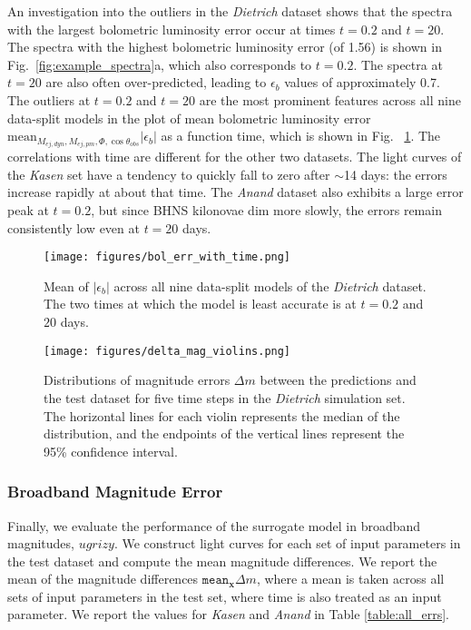 \documentclass[fleqn,usenatbib,useAMS]{mnras}
\begin{document}
An investigation into the outliers in the \emph{Dietrich} dataset shows that the spectra with the largest bolometric luminosity error occur at times $t=0.2$ and $t=20$.
The spectra with the highest bolometric luminosity error (of 1.56) is shown in Fig.~\ref{fig:example_spectra}a, which also corresponds to $t=0.2$.
The spectra at $t=20$ are also often over-predicted, leading to $\epsilon_b$ values of approximately 0.7.
The outliers at $t=0.2$ and $t=20$ are the most prominent features across all nine data-split models in the plot of mean bolometric luminosity error $\text{mean}_{M_{ej, dyn}, M_{ej, pm}, \Phi, \cos \theta_{obs}} | \epsilon_b|$ as a function time, which is shown in Fig.~ \ref{fig:bolometric_v_time}.
The correlations with time are different for the other two datasets.
The light curves of the \emph{Kasen} set have a tendency to quickly fall to zero after $\sim$14 days: the errors increase rapidly at about that time.
The \emph{Anand} dataset also exhibits a large error peak at $t=0.2$, but since BHNS kilonovae dim more slowly, the errors remain consistently low even at $t=20$ days.



\begin{figure}
    \centering
    \texttt{[image: figures/bol\_err\_with\_time.png]}
    \caption{Mean of $|\epsilon_b|$ across all nine data-split models of the \emph{Dietrich} dataset. 
    The two times at which the model is least accurate is at $t=0.2$ and $20$ days.}
    \label{fig:bolometric_v_time}
\end{figure}

\begin{figure*}
    \centering
    \texttt{[image: figures/delta\_mag\_violins.png]}
    \caption{Distributions of magnitude errors $\Delta m$ between the predictions and the test dataset for five time steps in the \emph{Dietrich} simulation set. 
    The horizontal lines for each violin represents the median of the distribution, and the endpoints of the vertical lines represent the 95\% confidence interval.}
    \label{fig:delta_mag_violins}
\end{figure*}

\subsubsection{Broadband Magnitude Error}
Finally, we evaluate the performance of the surrogate model in broadband magnitudes, $ugrizy$. 
We construct light curves for each set of input parameters in the test dataset and compute the mean magnitude differences. 
We report the mean of the magnitude differences $\texttt{mean}_{\mathbf{x}}\Delta m$, where a mean is taken across all sets of input parameters in the test set, where time is also treated as an input parameter.
We report the values for \emph{Kasen} and \emph{Anand} in Table \ref{table:all_errs}. 
\end{document}
